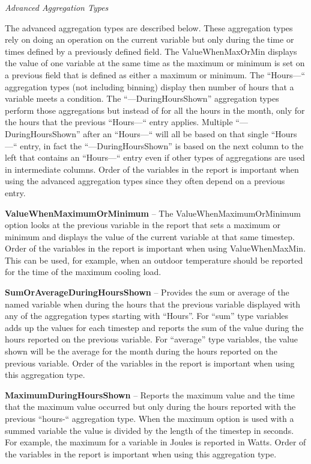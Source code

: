 \emph{Advanced Aggregation Types}

The advanced aggregation types are described below. These aggregation types rely on doing an operation on the current variable but only during the time or times defined by a previously defined field. The ValueWhenMaxOrMin displays the value of one variable at the same time as the maximum or minimum is set on a previous field that is defined as either a maximum or minimum. The ``Hours---`` aggregation types (not including binning) display then number of hours that a variable meets a condition. The ``---DuringHoursShown'' aggregation types perform those aggregations but instead of for all the hours in the month, only for the hours that the previous ``Hours---`` entry applies. Multiple ``---DuringHoursShown'' after an ``Hours---`` will all be based on that single ``Hours---`` entry, in fact the ``---DuringHoursShown'' is based on the next column to the left that contains an ``Hours---`` entry even if other types of aggregations are used in intermediate columns. Order of the variables in the report is important when using the advanced aggregation types since they often depend on a previous entry.

\textbf{ValueWhenMaximumOrMinimum} -- The ValueWhenMaximumOrMinimum option looks at the previous variable in the report that sets a maximum or minimum and displays the value of the current variable at that same timestep. Order of the variables in the report is important when using ValueWhenMaxMin. This can be used, for example, when an outdoor temperature should be reported for the time of the maximum cooling load.

\textbf{SumOrAverageDuringHoursShown} -- Provides the sum or average of the named variable when during the hours that the previous variable displayed with any of the aggregation types starting with ``Hours''. For ``sum'' type variables adds up the values for each timestep and reports the sum of the value during the hours reported on the previous variable. For ``average'' type variables, the value shown will be the average for the month during the hours reported on the previous variable. Order of the variables in the report is important when using this aggregation type.

\textbf{MaximumDuringHoursShown} -- Reports the maximum value and the time that the maximum value occurred but only during the hours reported with the previous ``hours-`` aggregation type. When the maximum option is used with a summed variable the value is divided by the length of the timestep in seconds. For example, the maximum for a variable in Joules is reported in Watts. Order of the variables in the report is important when using this aggregation type.

